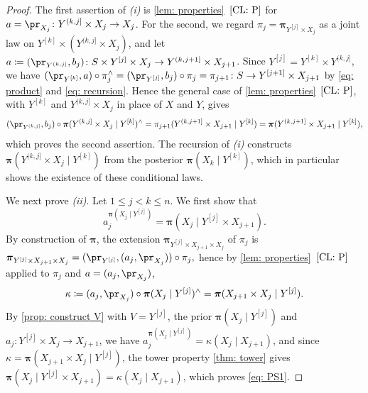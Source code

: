 \documentclass[12pt,reqno]{amsart}%
\theoremstyle{plain}
\theoremstyle{definition}
\def\bspi{\boldsymbol{\pi}}
\begin{document}
\begin{proof}
	The first assertion of \textit{(i)} is \cref{lem: properties}~$\ref{CL: P}$ for $a=\pr_{X_j}\colon Y^{(k,j]}\times X_j\rightarrow X_j$.
	For the second, we regard $\pi_j=\bspi_{Y^{[j]}\times X_j}$ as a joint law on $Y^{[k]}\times(Y^{(k,j]}\times X_j)$,
	and let $a\coloneqq(\pr_{Y^{(k,j]}},b_j)\colon S\times Y^{[j]}\times X_j\rightarrow Y^{(k,j+1]}\times X_{j+1}$.
	Since $Y^{[j]}=Y^{[k]}\times Y^{(k,j]}$, we have $(\pr_{Y^{[k]}},a)\circ\pi_j^\wedge=(\pr_{Y^{[j]}},b_j)\circ\pi_j=\pi_{j+1}\colon S\rightarrow Y^{[j+1]}\times X_{j+1}$
	by \eqref{eq: product} and \eqref{eq: recursion}.
	Hence the general case of \cref{lem: properties}~$\ref{CL: P}$, with $Y^{[k]}$ and $Y^{(k,j]}\times X_j$ in place of $X$ and $Y$, gives
	\[
		(\pr_{Y^{(k,j]}},b_j)\circ\bspi(Y^{(k,j]}\times X_j\mid Y^{[k]})^\wedge=\pi_{j+1}(Y^{(k,j+1]}\times X_{j+1}\mid Y^{[k]})
		=\bspi(Y^{(k,j+1]}\times X_{j+1}\mid Y^{[k]}),
	\]
	which proves the second assertion.
	The recursion of \textit{(i)} constructs $\bspi(Y^{(k,j]}\times X_j\mid Y^{[k]})$ from the posterior
	$\bspi(X_k\mid Y^{[k]})$, which in particular shows the existence of these conditional laws.

	We next prove \textit{(ii)}.  Let $1\leq j<k\leq n$.
	We first show that
	\begin{equation}\label{eq: PS1}
		a_j^{\bspi(X_j\mid Y^{[j]})}=\bspi(X_j\mid Y^{[j]}\times X_{j+1}).
	\end{equation}
	By construction of $\bspi$, the extension $\bspi_{Y^{[j]}\times X_{j+1}\times X_j}$ of $\pi_j$ is
	$
		\bspi_{Y^{[j]}\times X_{j+1}\times X_j}=(\pr_{Y^{[j]}},(a_j,\pr_{X_j}))\circ\pi_j,
	$
	hence by \cref{lem: properties}~$\ref{CL: P}$ applied to $\pi_j$ and $a=(a_j,\pr_{X_j})$,
	\[
		\kappa\coloneqq(a_j,\pr_{X_j})\circ\bspi(X_j\mid Y^{[j]})^\wedge
		=\bspi(X_{j+1}\times X_j\mid Y^{[j]}).
	\]
	By \cref{prop: construct V} with $V=Y^{[j]}$, the prior $\bspi(X_j\mid Y^{[j]})$
	and $a_j\colon Y^{[j]}\times X_j\rightarrow X_{j+1}$, we have
	$a_j^{\bspi(X_j\mid Y^{[j]})}=\kappa(X_j\mid X_{j+1})$,
	and since $\kappa=\bspi(X_{j+1}\times X_j\mid Y^{[j]})$, the tower property \cref{thm: tower} gives
	$\bspi(X_j\mid Y^{[j]}\times X_{j+1})=\kappa(X_j\mid X_{j+1})$,
	which proves \eqref{eq: PS1}.


\end{proof}
\end{document}
